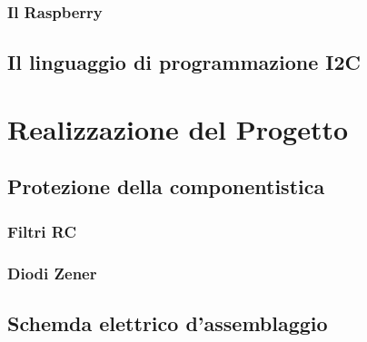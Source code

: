 \documentclass[10pt]{article}
\begin{document}
		\subsubsection{Il Raspberry}
		
	\subsection{Il linguaggio di programmazione I2C}

\section{Realizzazione del Progetto}

	\subsection{Protezione della componentistica}
		\subsubsection{Filtri RC}
		
		\subsubsection{Diodi Zener}
	
	\subsection{Schemda elettrico d'assemblaggio}
\end{document}
